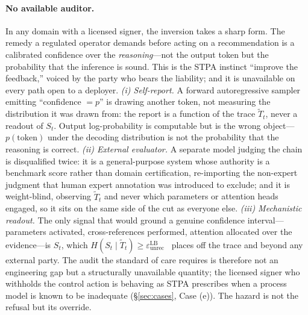 \documentclass[11pt]{article}
\begin{document}
\paragraph{No available auditor.} In any domain with a licensed signer, the inversion takes a sharp form. The remedy a regulated operator demands before acting on a recommendation is a calibrated confidence over the \emph{reasoning}---not the output token but the probability that the inference is sound. This is the STPA instinct ``improve the feedback,'' voiced by the party who bears the liability; and it is unavailable on every path open to a deployer. \emph{(i) Self-report.} A forward autoregressive sampler emitting ``confidence $=p$'' is drawing another token, not measuring the distribution it was drawn from: the report is a function of the trace $\tilde T_t$, never a readout of $S_t$. Output log-probability is computable but is the wrong object---$p(\text{token})$ under the decoding distribution is not the probability that the reasoning is correct. \emph{(ii) External evaluator.} A separate model judging the chain is disqualified twice: it is a general-purpose system whose authority is a benchmark score rather than domain certification, re-importing the non-expert judgment that human expert annotation was introduced to exclude; and it is weight-blind, observing $\tilde T_t$ and never which parameters or attention heads engaged, so it sits on the same side of the cut as everyone else. \emph{(iii) Mechanistic readout.} The only signal that would ground a genuine confidence interval---parameters activated, cross-references performed, attention allocated over the evidence---is $S_t$, which $H(S_t\mid\tilde T_t)\ge\varepsilon_{\mathrm{unrec}}^{\mathrm{LB}}$~\cite{anon2026dual} places off the trace and beyond any external party. The audit the standard of care requires is therefore not an engineering gap but a structurally unavailable quantity; the licensed signer who withholds the control action is behaving as STPA prescribes when a process model is known to be inadequate (\S\ref{sec:cases}, Case (e)). The hazard is not the refusal but its override.
\end{document}
